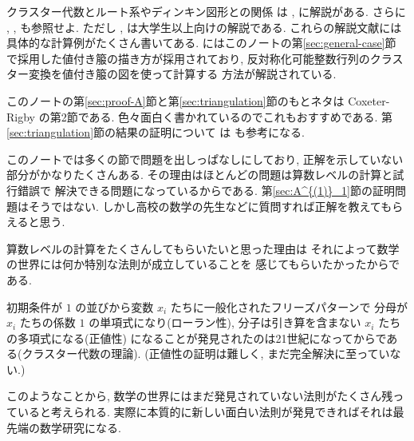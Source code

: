 \documentclass[12pt,twoside,dvipdfm]{jarticle}
\theoremstyle{definition} %
\theoremstyle{definition} %
\theoremstyle{definition} %
\numberwithin{theorem}{section}
\numberwithin{equation}{section}
\numberwithin{figure}{section}
\numberwithin{table}{section}
\newcommand\secref[1]{第\ref{#1}節}
\begin{document}
クラスター代数とルート系やディンキン図形との関係
は \cite{Nakajima2009}, \cite{Nakajima2012} に解説がある. 
さらに \cite{Kuroki2010}, \cite{Kuroki-rank2}, \cite{Kuroki-QG2} も参照せよ.
ただし \cite{Kuroki-rank2}, \cite{Kuroki-QG2} は大学生以上向けの解説である.
これらの解説文献には具体的な計算例がたくさん書いてある.
\cite{Kuroki-QG2} にはこのノートの\secref{sec:general-case}
で採用した値付き箙の描き方が採用されており, 
反対称化可能整数行列のクラスター変換を値付き箙の図を使って計算する
方法が解説されている.

このノートの\secref{sec:proof-A}と\secref{sec:triangulation}のもとネタは
Coxeter-Rigby \cite{Coxeter-Rigby} の第2節である.
色々面白く書かれているのでこれもおすすめである.
\secref{sec:triangulation}の結果の証明について
は \cite{Broline-Crowe-Isaacs} も参考になる.

このノートでは多くの節で問題を出しっぱなしにしており, 
正解を示していない部分がかなりたくさんある.
その理由はほとんどの問題は算数レベルの計算と試行錯誤で
解決できる問題になっているからである.
\secref{sec:A^{(1)}_1}の証明問題はそうではない.
しかし高校の数学の先生などに質問すれば正解を教えてもらえると思う.

算数レベルの計算をたくさんしてもらいたいと思った理由は
それによって数学の世界には何か特別な法則が成立していることを
感じてもらいたかったからである.

初期条件が $1$ の並びから変数 $x_i$ たちに一般化されたフリーズパターンで
分母が $x_i$ たちの係数 $1$ の単項式になり(ローラン性), 
分子は引き算を含まない $x_i$ たちの多項式になる(正値性)
になることが発見されたのは21世紀になってからである(クラスター代数の理論).
(正値性の証明は難しく, まだ完全解決に至っていない.)

このようなことから, 
数学の世界にはまだ発見されていない法則がたくさん残っていると考えられる. 
実際に本質的に新しい面白い法則が発見できればそれは最先端の数学研究になる.

\end{document}
